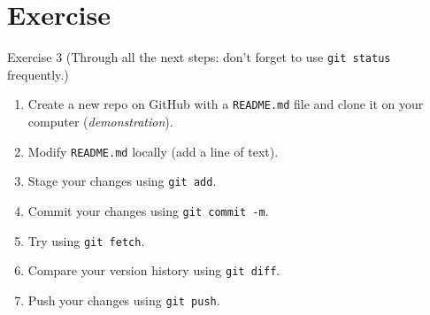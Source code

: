 \documentclass[handout]{beamer}
\begin{document}
\section{Exercise}

\begin{frame}{Exercise 3}
(Through all the next steps: don't forget to use \texttt{git status} frequently.)
\begin{enumerate}
	\item Create a new repo on GitHub with a \texttt{README.md} file and clone it on your computer (\textit{demonstration}).
	\item Modify \texttt{README.md} locally (add a line of text).
	\item Stage your changes using \texttt{git add}.
	\item Commit your changes using \texttt{git commit -m}.
	\item Try using \texttt{git fetch}.
	\item Compare your version history using \texttt{git diff}.
	\item Push your changes using \texttt{git push}.
\end{enumerate}

\end{frame}
	
\end{document}
